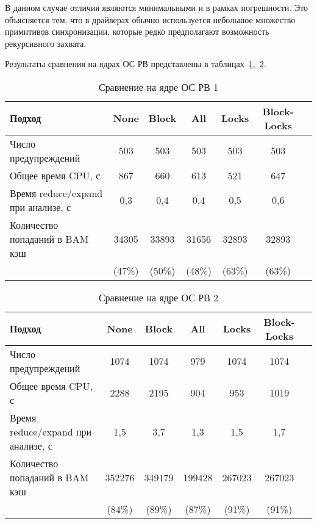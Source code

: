 В данном случае отличия являются минимальными и в рамках погрешности. 
Это объясняется тем, что в драйверах обычно используется небольшое множество примитивов синхронизации, которые редко предполагают возможность рекурсивного захвата.

Результаты сравнения на ядрах ОС РВ представлены в таблицах~\ref{table-os-lock-reduce-1},~\ref{table-os-lock-reduce-2}.

  \begin{table}[h]\footnotesize \centering
    \caption{Сравнение на ядре ОС РВ 1}
  	\label{table-os-lock-reduce-1}
    \begin{tabular}{ | l | c | c | c | c | c | c | }
      \hline
      Подход         						& None 			& Block 	& All		& Locks 	& Block-Locks	\\ \hline
      Число предупреждений 					& 503   		& 503       & 503   	& 503   	& 503       	\\ 
      Общее время CPU, с 					& 867 			& 660 		& 613   	& 521 		& 647 	 		\\ 
\hspace{0.5cm} Время reduce/expand при анализе, с & 0,3		& 0,4 		& 0,4   	& 0,5 		& 0,6 	  		\\ \hline
      Количество попаданий в BAM кэш		& 34305  		& 33893   	& 31656   	& 32893  	& 32893  	\\ 
      										& (47\%)		& (50\%)  	& (48\%)	& (63\%)	& (63\%)	\\
      \hline
    \end{tabular}
  \end{table}

  \begin{table}[h]\footnotesize \centering
    \caption{Сравнение на ядре ОС РВ 2}
  	\label{table-os-lock-reduce-2}
    \begin{tabular}{ | l | c | c | c | c | c | c | }
      \hline
      Подход         						& None 		& Block 	& All 		& Locks 	& Block-Locks 	\\ \hline %
      Число предупреждений 					& 1074  	& 1074      & 979   	& 1074   	& 1074  		\\ %
      Общее время CPU, с 					& 2288 		& 2195 		& 904   	& 953 		& 1019 			\\ %
\hspace{0.5cm} Время reduce/expand
 							при анализе, с	& 1,5 		& 3,7 		& 1,3   	& 1,5 		& 1,7 	 		\\ \hline %
      Количество попаданий в BAM кэш		& 352276  	& 349179  	& 199428   	& 267023  	& 267023  		\\ %
      										& (84\%)	& (89\%)	& (87\%)	& (91\%) 	& (91\%) 		\\ %
      \hline
    \end{tabular}
  \end{table}

